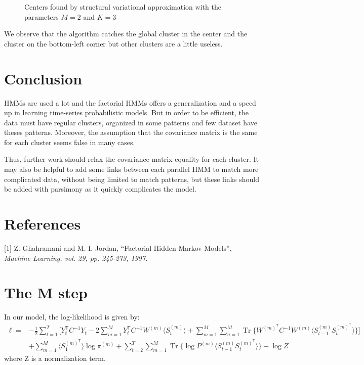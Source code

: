 \documentclass{article}
\DeclareMathOperator{\Tr}{Tr}
\begin{document}
\begin{figure}[h]
\begin{minipage}[b]{0.49\linewidth}
		\begin{center}
			\caption{Centers found by structural variational approximation with the parameters $M = 2$ and $K = 3$}
		\end{center}\medskip
	\end{minipage}
	\label{fig:f}
\end{figure}

We observe that the algorithm catches the global cluster in the center and the cluster on the bottom-left corner but other clusters are a little useless.

\clearpage
\section{Conclusion}

HMMs are used a lot and the factorial HMMs offers a generalization and a speed up in learning time-series probabilistic models. But in order to be efficient, the data must have regular clusters, organized in some patterns and few dataset have theses patterns. Moreover, the assumption that the covariance matrix is the same for each cluster seems false in many cases.
\newline

Thus, further work should relax the covariance matrix equality for each cluster. It may also be helpful to add some links between each parallel HMM to match more complicated data, without being limited to match patterns, but these links should be added with parsimony as it quickly complicates the model.


\section*{References}

\small

[1] Z. Ghahramani and M. I. Jordan, ``Factorial Hidden Markov Models'', \it{Machine Learning}, vol. 29, pp. 245-273, 1997.

\normalsize

\appendix

\section{The M step}

In our model, the log-likelihood is given by:
\begin{align*}
\ell = &-\frac{1}{2} \sum_{t=1}^T \Bigg[Y_t^\mathsf{T} C^{-1} Y_t - 2 \sum_{m=1}^M Y_t^\mathsf{T} C^{-1} W^{(m)} \langle S_t^{(m)} \rangle + \sum_{m=1}^M \sum_{n=1}^M \Tr\bigg\{ W^{(m)^\mathsf{T}} C^{-1} W^{(m)} \langle S_{t-1}^{(m)} S_{t}^{(m)^\mathsf{T}} \rangle \bigg\} \Bigg] \\
&+ \sum_{m=1}^M \langle S_1^{(m)^\mathsf{T}} \rangle \log \pi^{(m)} + \sum_{t=2}^T \sum_{m=1}^M \Tr\Big\{ \log P^{(m)} \langle S_{t-1}^{(m)} S_{t}^{(m)^\mathsf{T}} \rangle \Big\} - \log Z
\end{align*} 
where Z is a normalization term.
\end{document}
